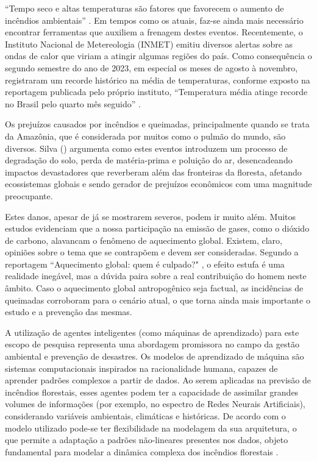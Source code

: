 \documentclass[tcc2]{uftex}
\begin{document}
``Tempo seco e altas temperaturas são fatores que favorecem o aumento de incêndios ambientais'' \cite{Silva21}. Em tempos como os atuais, faz-se ainda mais necessário encontrar ferramentas que auxiliem a frenagem destes eventos. Recentemente, o Instituto Nacional de Metereologia (INMET) emitiu diversos alertas sobre as ondas de calor que viriam a atingir algumas regiões do país. Como consequência o segundo semestre do ano de 2023, em especial os meses de agosto à novembro, registraram um recorde histórico na média de temperaturas, conforme exposto na reportagem publicada pelo próprio instituto, ``Temperatura média atinge recorde no Brasil pelo quarto mês seguido'' \cite{inmet23:ondadecalor}.

Os prejuízos causados por incêndios e queimadas, principalmente quando se trata da Amazônia, que é considerada por muitos como o pulmão do mundo, são diversos. Silva (\citeyear{Silva21}) argumenta como estes eventos introduzem um processo de degradação do solo, perda de matéria-prima e poluição do ar, desencadeando impactos devastadores que reverberam além das fronteiras da floresta, afetando ecossistemas globais e sendo gerador de prejuízos econômicos com uma magnitude preocupante.

Estes danos, apesar de já se mostrarem severos, podem ir muito além. Muitos estudos evidenciam que a nossa participação na emissão de gases, como o dióxido de carbono, alavancam o fenômeno de aquecimento global. Existem, claro, opiniões sobre o tema que se contrapõem e devem ser consideradas. Segundo a reportagem ``Aquecimento global: quem é culpado?" \cite{Aguiar13}, o efeito estufa é uma realidade inegável, mas a dúvida paira sobre a real contribuição do homem neste âmbito. Caso o aquecimento global antropogênico seja factual, as incidências de queimadas corroboram para o cenário atual, o que torna ainda mais importante o estudo e a prevenção das mesmas.

A utilização de agentes inteligentes (como máquinas de aprendizado) para este escopo de pesquisa representa uma abordagem promissora no campo da gestão ambiental e prevenção de desastres. Os modelos de aprendizado de máquina são sistemas computacionais inspirados na racionalidade humana, capazes de aprender padrões complexos a partir de dados. Ao serem aplicadas na previsão de incêndios florestais, esses agentes podem ter a capacidade de assimilar grandes volumes de informações (por exemplo, no espectro de Redes Neurais Artificiais), considerando variáveis ambientais, climáticas e históricas. De acordo com o modelo utilizado pode-se ter flexibilidade na modelagem da sua arquitetura, o que permite a adaptação a padrões não-lineares presentes nos dados, objeto fundamental para modelar a dinâmica complexa dos incêndios florestais \cite{Ferneda06}.
\end{document}
